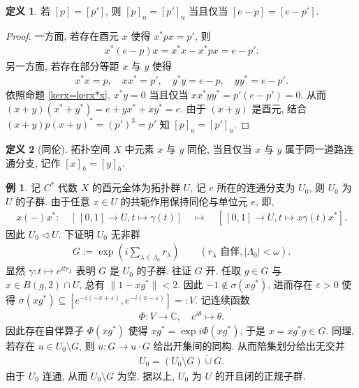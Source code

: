 \documentclass{MainStyle}
\theoremstyle{definition}
\newtheorem{example}{例}
\theoremstyle{definition}
\theoremstyle{definition}
\newtheorem{definition}{定义}
\theoremstyle{definition}
\theoremstyle{definition}
\theoremstyle{definition}
\theoremstyle{definition}
\theoremstyle{remark}
\theoremstyle{remark}
\begin{document}
\begin{definition}
    若 $[p]=[p']$, 则 $[p]_u=[p']_u$ 当且仅当 $[e-p]=[e-p']$.
    \begin{proof}
        一方面, 若存在酉元 $x$ 使得 $x^\ast px=p'$, 则
        \begin{align*}
            x^\ast (e-p)x=x^\ast x -x^\ast px=e-p'.
        \end{align*}
        另一方面, 若存在部分等距 $x$ 与 $y$ 使得
        \begin{align*}
            x^\ast x=p, \quad xx^\ast =p',\quad y^\ast y=e-p,\quad yy^\ast =e-p'.
        \end{align*}
        依照命题 \ref{kerx=kerx*x}, $x^\ast y=0$ 当且仅当 $xx^\ast yy^\ast =p'(e-p')=0$. 从而 $(x+y)(x^\ast +y^\ast)=e+yx^\ast +xy^\ast=e$. 由于 $(x+y)$ 是酉元, 结合 $(x+y)p(x+y)^\ast=(p')^3=p'$ 知 $[p]_u=[p']_u$.
    \end{proof}
\end{definition}

\begin{definition}[同伦]
    拓扑空间 $X$ 中元素 $x$ 与 $y$ 同伦, 当且仅当 $x$ 与 $y$ 属于同一道路连通分支, 记作 $[x]_h=[y]_h$.
\end{definition}

\begin{example}\label{structure-de-U0}
    记 $C^\ast$ 代数 $X$ 的酉元全体为拓扑群 $U$, 记 $e$ 所在的连通分支为 $U_0$, 则 $U_0$ 为 $U$ 的子群. 由于任意 $x\in U$ 的共轭作用保持同伦与单位元 $e$, 即,
    \begin{align*}
        x(-)x^\ast:\quad  [\,[0,1]\to U, t\mapsto \gamma(t)]\quad \mapsto \quad  [\,[0,1]\to U, t\mapsto x\gamma(t)x^\ast].
    \end{align*}
    因此 $U_0\lhd U$. 下证明 $U_0$ 无非群
    \begin{align*}
        G:=\exp \left(i\sum_{\lambda \in \Lambda_0} r_\lambda\right) \qquad (r_\lambda \text{ 自伴}, |\Lambda_0|<\omega ).
    \end{align*}
    显然 $\gamma:t\mapsto e^{itr_\lambda}$ 表明 $G$ 是 $U_0$ 的子群. 往证 $G$ 开. 任取 $g\in G$ 与 $x\in B(g,2)\cap U$, 总有 $\|1-xg^\ast \|<2$. 因此 $-1\notin \sigma(xg^\ast)$, 进而存在 $\varepsilon >0$ 使得 $\sigma(xg^\ast)\subseteq [e^{-i(-\pi+\varepsilon)},e^{-i(\pi-\varepsilon)}]=:V$. 记连续函数
    \begin{align*}
        \Phi:V\to \mathbb C, \quad e^{i\theta}\mapsto \theta.
    \end{align*}
    因此存在自伴算子 $\Phi(xg^\ast)$ 使得 $xg^\ast = \exp i\Phi(x g^\ast)$, 于是 $x=xg^\ast g\in G$. 同理, 若存在 $u\in U_0\setminus G$, 则 $u:G\to u\cdot G$ 给出开集间的同构. 从而陪集划分给出无交并
    \begin{align*}
        U_0=(U_0\setminus G)\dot\cup G.
    \end{align*}
    由于 $U_0$ 连通, 从而 $U_0\setminus G$ 为空. 据以上, $U_0$ 为 $U$ 的开且闭的正规子群.
\end{example}
\end{document}
